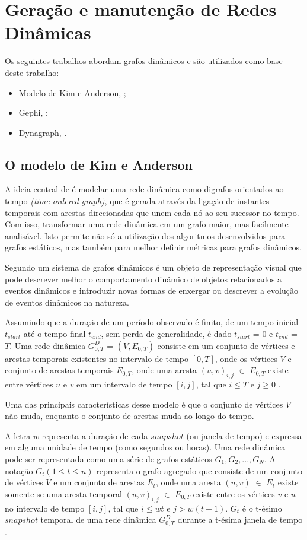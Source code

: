 \FloatBarrier

\section{Geração e manutenção de Redes Dinâmicas}
Os seguintes trabalhos abordam grafos dinâmicos e são utilizados como base deste trabalho:
\begin{itemize}
\item Modelo de Kim e Anderson, \cite{kim};
\item Gephi, \cite{gephi};
\item Dynagraph, \cite{dynagraph}.
\end{itemize}


\subsection{O modelo de Kim e Anderson}
A ideia central de \cite{kim} é modelar uma rede dinâmica como digrafos orientados
ao tempo \textit{(time-ordered graph)}, que é gerada através da ligação de instantes temporais com arestas
direcionadas que unem cada nó ao seu sucessor no tempo. Com isso, transformar uma rede dinâmica
em um grafo maior, mas facilmente analisável. Isto permite não só a utilização dos algoritmos
desenvolvidos para grafos estáticos, mas também para melhor definir métricas para
grafos dinâmicos.

Segundo \cite{kim} um sistema de grafos dinâmicos é um objeto de representação visual que pode descrever
melhor o comportamento dinâmico de objetos rela\-cio\-nados a eventos dinâmicos e introduzir
novas formas de enxergar ou descrever a evolução de eventos dinâmicos na natureza.

Assumindo que a duração de um período observado é finito, de um tempo inicial $t_{start}$ até o tempo final $t_{end}$, sem perda de
generalidade, é dado $t_{start}$ = $0$ e $t_{end}$ = $T$. Uma rede dinâmica $G^D_{0,T}$ = $(V, E_{0,T})$ consiste
em um conjunto de vértices e arestas temporais existentes no intervalo de tempo $[0,T]$, onde
os vértices $V$ e conjunto de arestas temporais $E_{0,T}$, onde uma aresta $(u,v)_{i,j}$ $\in$ $E_{0,T}$
existe entre vértices $u$ e $v$ em um intervalo de tempo $[i,j]$, tal que $i \leqslant T$ e $j \geqslant 0$ \cite{kim}.

Uma das principais características desse modelo é que o conjunto de vértices $V$ não muda,
enquanto o conjunto de arestas muda ao longo do tempo.

A letra $w$ representa a duração de cada $snapshot$ (ou janela de tempo) e expressa em alguma unidade de tempo (como segundos ou horas).
Uma rede dinâmica pode ser representada como uma série de grafos estáticos $G_1, G_2, ..., G_N$.
A notação $G_t(1 \leqslant t \leqslant n)$ representa o grafo agregado que consiste
de um conjunto de vértices $V$ e um conjunto de arestas $E_t$, onde uma aresta $(u,v)$ $\in$ $E_t$ existe
somente se uma aresta temporal $(u,v)_{i,j}$ $\in$ $E_{0,T}$ existe entre os vértices $v$ e $u$ no intervalo
de tempo $[i,j]$, tal que $i \leqslant wt$ e $j > w(t-1)$. $G_t$ é o t-ésimo $snapshot$ temporal de uma
rede dinâmica $G^D_{0,T}$ durante a t-ésima janela de tempo \cite{kim}.

